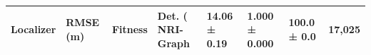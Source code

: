 \begin{tabular}{lllll}
\toprule
Localizer & RMSE (m) & Fitness & Det. (%
\midrule
NRI-Graph & 14.06 ± 0.19 & 1.000 ± 0.000 & 100.0 ± 0.0 & 17,025 \\
\bottomrule
\end{tabular}
